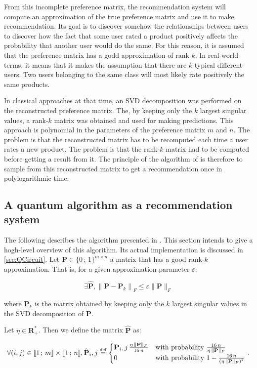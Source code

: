 \documentclass[11pt, a4paper]{article}
\begin{document}
            From this incomplete preference matrix, the recommendation system will compute an approximation of the true preference matrix and use it to make recommendation. Its goal is to discover somehow the relationships between users to discover how the fact that some user rated a product positively affects the probability that another user would do the same. For this reason, it is assumed that the preference matrix has a godd approximation of rank \(k\). In real-world terms, it means that it makes the assumption that there are \(k\) typical different users. Two users belonging to the same class will most likely rate positively the same products.
            
            In classical approaches at that time, an SVD decomposition was performed on the reconstructed preference matrix. The, by keeping only the \(k\) largest singular values, a rank-\(k\) matrix was obtained and used for making predictions. This approach is polynomial in the parameters of the preference matrix \(m\) and \(n\). The problem is that the reconstructed matrix has to be recomputed each time a user rates a new product. The problem is that the rank-\(k\) matrix had to be computed before getting a result from it. The principle of the algorithm of \citeauthor{QRS} is therefore to sample from this reconstructed matrix to get a recommendation once in polylogarithmic time.
        \subsection{A quantum algorithm as a recommendation system}
            The following describes the algorithm presented in \cite{QRS}. This section intends to give a hogh-level overview of this algorithm. Its actual implementation is discussed in \autoref{sec:QCircuit}. Let \(\mathbf{P}\in\{0\,;\,1\}^{m\times n}\) a matrix that has a good rank-\(k\) approximation. That is, for a given approximation parameter \(\varepsilon\):
            
            \[\exists\hat{\mathbf{P}},\left\|\mathbf{P} - \mathbf{P}_k\right\|_F\leqslant\varepsilon\|\mathbf{P}\|_F\]
            
            where \(\mathbf{P}_k\) is the matrix obtained by keeping only the \(k\) largest singular values in the SVD decomposition of \(\mathbf{P}\).
            
            Let \(\eta\in\mathbf{R}_+^*\). Then we define the matrix \(\hat{\mathbf{P}}\) as:
            
            \[\forall(i, j)\in\llbracket1\,;\,m\rrbracket\times\llbracket1\,;\,n\rrbracket,\hat{\mathbf{P}}_i,j\overset{\text{\tiny{def}}}{=}\begin{cases}\mathbf{P}_i,j\,\frac{\eta\,\|\mathbf{P}\|_F}{16\,n}&\text{with probability } \frac{16\,n}{\eta\,\|\mathbf{P}\|_F}\\0&\text{with probability } 1-\frac{16\,n}{\left(\eta\,\|\mathbf{P}\|_F\right)^2}\end{cases}\,.\]
            
\end{document}

